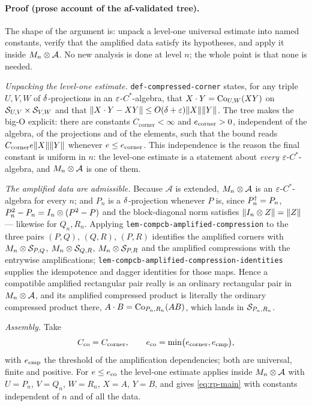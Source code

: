 \paragraph{Proof (prose account of the af-validated tree).}
The shape of the argument is: unpack a level-one universal estimate into named constants,
verify that the amplified data satisfy its hypotheses, and apply it inside
$M_{n}\otimes \mathcal A$. No new analysis is done at level $n$; the whole point is that none
is needed.

\emph{Unpacking the level-one estimate.} \texttt{def-compressed-corner} states, for any
triple $U,V,W$ of $\delta$-projections in an $\varepsilon$-$C^*$-algebra, that
$X\mathbin{\cdot} Y=\mathrm{Co}_{U,W}(XY)$ on $\mathcal S_{U,V}\times\mathcal S_{V,W}$ and that
$\lVert X\mathbin{\cdot} Y-XY\rVert\le O(\delta+\varepsilon)\lVert X\rVert\lVert Y\rVert$. The tree makes the big-O explicit:
there are constants $C_{\mathrm{corner}}<\infty$ and $e_{\mathrm{corner}}>0$,
independent of the algebra, of the projections and of the elements, such that the bound
reads $C_{\mathrm{corner}}e\lVert X\rVert\lVert Y\rVert$ whenever $e\le e_{\mathrm{corner}}$.
This independence is the reason the final constant is uniform in $n$: the level-one
estimate is a statement about \emph{every} $\varepsilon$-$C^*$-algebra, and $M_{n}\otimes \mathcal A$
is one of them.

\emph{The amplified data are admissible.} Because $\mathcal A$ is extended,
$M_{n}\otimes \mathcal A$ is an $\varepsilon$-$C^*$-algebra for every $n$; and $P_n$ is a
$\delta$-projection whenever $P$ is, since $P_n^{\dagger}=P_n$,
$P_n^2-P_n=I_{n}\otimes (P^2-P)$ and the block-diagonal norm satisfies
$\lVert I_{n}\otimes Z\rVert=\lVert Z\rVert$ --- likewise for $Q_n,R_n$. Applying
\texttt{lem-compcb-amplified-compression} to the three pairs $(P,Q)$, $(Q,R)$, $(P,R)$
identifies the amplified corners with $M_{n}\otimes \mathcal S_{P,Q}$, $M_{n}\otimes \mathcal S_{Q,R}$,
$M_{n}\otimes \mathcal S_{P,R}$ and the amplified compressions with the entrywise amplifications;
\texttt{lem-compcb-amplified-compression-identities} supplies the idempotence and dagger
identities for those maps. Hence a compatible amplified rectangular pair really is an
ordinary rectangular pair in $M_{n}\otimes \mathcal A$, and its amplified compressed product
is literally the ordinary compressed product there, $A\mathbin{\cdot} B=\mathrm{Co}_{P_n,R_n}(AB)$, which
lands in $\mathcal S_{P_n,R_n}$.

\emph{Assembly.} Take
\[
  C_{\mathrm{co}}=C_{\mathrm{corner}},\qquad
  e_{\mathrm{co}}=\min\bigl(e_{\mathrm{corner}},e_{\mathrm{cmp}}\bigr),
\]
with $e_{\mathrm{cmp}}$ the threshold of the amplification dependencies; both are
universal, finite and positive. For $e\le e_{\mathrm{co}}$ the level-one estimate
applies inside $M_{n}\otimes \mathcal A$ with $U=P_n$, $V=Q_n$, $W=R_n$, $X=A$, $Y=B$, and
gives \eqref{eq:rp-main} with constants independent of $n$ and of all the data.

